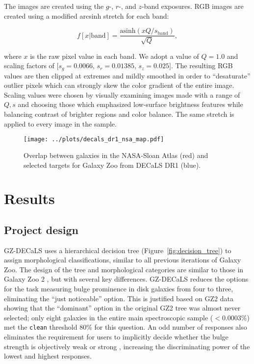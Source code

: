 \documentclass[iop,apj,tighten]{emulateapj}
\begin{document}
The  images are created using the $g$-, $r$-, and $z$-band exposures. RGB images are created using a modified arcsinh stretch \citep{lup04} for each band:

\begin{equation}
f[x|\text{band}]=\frac{\text{asinh}(x Q/s_\text{band})}{\sqrt{Q}},
\end{equation}

\noindent where $x$ is the raw pixel value in each band. We adopt a value of $Q=1.0$ and scaling factors of $[s_g = 0.0066$, $s_r = 0.01385$, $s_z = 0.025]$. The resulting RGB values are then clipped at extremes and mildly smoothed in order to ``desaturate'' outlier pixels which can strongly skew the color gradient of the entire image. Scaling values were chosen by visually examining images made with a range of $Q,s$ and choosing those which emphasized low-surface brightness features while balancing contrast of brighter regions and color balance. The same stretch is applied to every image in the sample. 

\begin{figure*}
\centering
\texttt{[image: ../plots/decals\_dr1\_nsa\_map.pdf]}
\caption{Overlap between galaxies in the NASA-Sloan Atlas (red) and selected targets for Galaxy Zoo from DECaLS DR1 (blue).\label{fig:dr1_map}}
\end{figure*}

\section{Results}

\subsection{Project design}\label{project}

GZ-DECaLS uses a hierarchical decision tree (Figure~\ref{fig:decision_tree}) to assign morphological classifications, similar to all previous iterations of Galaxy Zoo. The design of the tree and morphological categories are similar to those in Galaxy Zoo 2 \citep{wil13}, but with several key differences. GZ-DECaLS reduces the options for the task measuring bulge prominence in disk galaxies from four to three, eliminating the ``just noticeable'' option. This is justified based on GZ2 data showing that the ``dominant'' option in the original GZ2 tree was almost never selected; only eight galaxies in the entire main spectroscopic sample ($<0.0003\%$) met the \texttt{clean} threshold 80\% for this question. An odd number of responses also eliminates the requirement for users to implicitly decide whether the bulge strength is objectively weak or strong \citep{cla95}, increasing the discriminating power of the lowest and highest responses.
\end{document}
